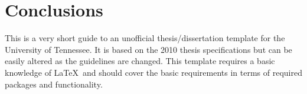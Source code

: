 \chapter{Conclusions} \label{ch:chapter4}

This is a very short guide to an unofficial thesis/dissertation template for the University of Tennessee. It is based on the 2010 thesis specifications but can be easily altered as the guidelines are changed. This template requires a basic knowledge of \LaTeX\ and should cover the basic requirements in terms of required packages and functionality.

